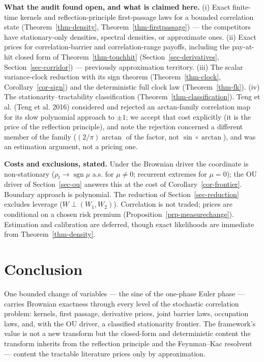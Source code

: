 \documentclass[
  english,
  10pt,
  letterpaper,
  DIV=11,
  numbers=noendperiod]{scrartcl}
\theoremstyle{plain}
\theoremstyle{plain}
\theoremstyle{plain}
\theoremstyle{plain}
\theoremstyle{definition}
\theoremstyle{remark}
\begin{document}
\textbf{What the audit found open, and what is claimed here.} (i) Exact
finite-time kernels and reflection-principle first-passage laws for a
bounded correlation state (Theorem~\ref{thm-density},
Theorem~\ref{thm-firstpassage}) --- the competitors have stationary-only
densities, spectral densities, or approximate ones. (ii) Exact prices
for correlation-barrier and correlation-range payoffs, including the
pay-at-hit closed form of Theorem~\ref{thm-touchhit}
(Section~\ref{sec-derivatives}, Section~\ref{sec-corridor}) ---
previously approximation territory. (iii) The scalar variance-clock
reduction with its sign theorem (Theorem~\ref{thm-clock},
Corollary~\ref{cor-sign}) and the deterministic full clock law
(Theorem~\ref{thm-fk}). (iv) The stationarity--tractability
classification (Theorem~\ref{thm-classification}). Teng et al. (Teng et
al. 2016) considered and rejected an arctan-family correlation map for
its slow polynomial approach to \(\pm1\); we accept that cost explicitly
(it is the price of the reflection principle), and note the rejection
concerned a different member of the family (\((2/\pi)\arctan\) of the
factor, not \(\sin\circ\arctan\)), and was an estimation argument, not a
pricing one.

\textbf{Costs and exclusions, stated.} Under the Brownian driver the
coordinate is non-stationary (\(\rho_t\to\operatorname{sgn}\mu\) a.s.
for \(\mu\neq0\); recurrent extremes for \(\mu=0\)); the OU driver of
Section~\ref{sec-ou} answers this at the cost of
Corollary~\ref{cor-frontier}. Boundary approach is polynomial. The
reduction of Section~\ref{sec-reduction} excludes leverage
(\(W\perp(W_1,W_2)\)). Correlation is not traded; prices are conditional
on a chosen risk premium (Proposition~\ref{prp-measurechange}).
Estimation and calibration are deferred, though exact likelihoods are
immediate from Theorem~\ref{thm-density}.

\section{Conclusion}\label{sec-conclusion}

One bounded change of variables --- the sine of the one-phase Euler
phase --- carries Brownian exactness through every level of the
stochastic correlation problem: kernels, first passage, derivative
prices, joint barrier laws, occupation laws, and, with the OU driver, a
classified stationarity frontier. The framework's value is not a new
transform but the closed-form and deterministic content the transform
inherits from the reflection principle and the Feynman--Kac resolvent
--- content the tractable literature prices only by approximation.
\end{document}
